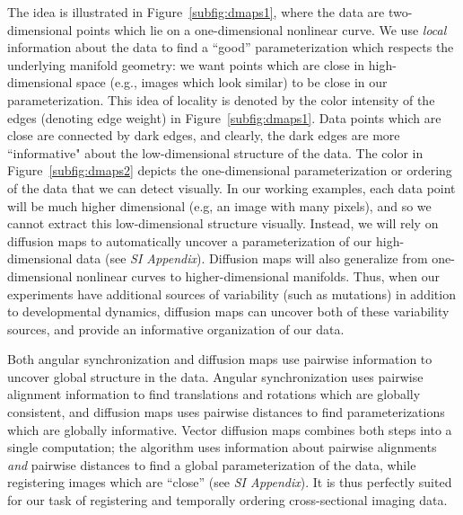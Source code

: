 \documentclass{pnastwo}
\begin{document}
\begin{article}
The idea is illustrated in Figure~\ref{subfig:dmaps1}, where the data are two-dimensional points which lie on a one-dimensional nonlinear curve.
%
We use {\it local} information about the data to find a ``good'' parameterization which respects the underlying manifold geometry: we want points which are close in high-dimensional space (e.g., images which look similar) to be close in our parameterization.
%
This idea of locality is denoted by the color intensity of the edges (denoting edge weight) in Figure~\ref{subfig:dmaps1}.
%
Data points which are close are connected by dark edges, and clearly, the dark edges are more ``informative" about the low-dimensional structure of the data.
%
The color in Figure~\ref{subfig:dmaps2} depicts the one-dimensional parameterization or ordering of the data that we can detect visually.
%
In our working examples, each data point will be much higher dimensional (e.g, an image with many pixels), and so we cannot extract this low-dimensional structure visually.
%
Instead, we will rely on diffusion maps to automatically uncover a parameterization of our high-dimensional data (see {\it SI Appendix}).
%
Diffusion maps will also generalize from one-dimensional nonlinear curves to higher-dimensional manifolds.
%
Thus, when our experiments have additional sources of variability (such as mutations) in addition to developmental dynamics, diffusion maps can uncover both of these variability sources, and provide an informative organization of our data. %

Both angular synchronization and diffusion maps use pairwise information to uncover global structure in the data.
%
Angular synchronization uses pairwise alignment information to find translations and rotations which are globally consistent, and diffusion maps uses pairwise distances to find parameterizations which are globally informative.
%
Vector diffusion maps combines both steps into a single computation;
the algorithm uses information about pairwise alignments {\em and} pairwise distances to find a global parameterization of the data, while registering images which are ``close'' (see {\it SI Appendix}).
%
It is thus perfectly suited for our task of registering and temporally ordering cross-sectional imaging data.
%


\end{article}
\end{document}
